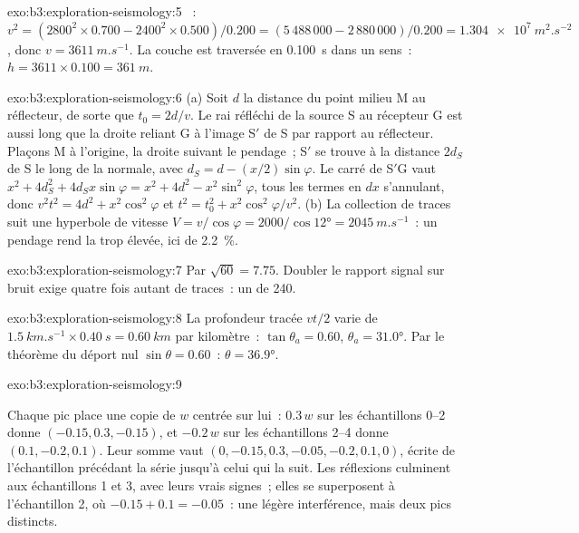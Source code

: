 \begin{solution}{exo:b3:exploration-seismology:5}
~: $v^2 = (2800^2\times0.700 - 2400^2\times0.500)/0.200 = (5\,488\,000 -
2\,880\,000)/0.200 = \qty{1.304e7}{m^2.s^{-2}}$, donc $v = \qty{3611}{m.s^{-1}}$.
La couche est traversée en \qty{0.100}{s} dans un sens~: $h = 3611\times0.100 =
\qty{361}{m}$.
\end{solution}

\begin{solution}{exo:b3:exploration-seismology:6}
(a) Soit $d$ la distance du point milieu M au réflecteur, de sorte que
$t_0 = 2d/v$. Le rai réfléchi de la source S au récepteur G est aussi long
que la droite reliant G à l'image S$'$ de S par rapport au réflecteur. Plaçons M à
l'origine, la droite suivant le pendage~; S$'$ se trouve à la distance $2d_S$ de S le long
de la normale, avec $d_S = d - (x/2)\sin\varphi$. Le carré de S$'$G vaut
$x^2 + 4d_S^2 + 4d_Sx\sin\varphi = x^2 + 4d^2 - x^2\sin^2\varphi$, tous les termes
en $dx$ s'annulant, donc $v^2t^2 = 4d^2 + x^2\cos^2\varphi$ et
$t^2 = t_0^2 + x^2\cos^2\varphi/v^2$. (b) La collection de traces suit une hyperbole de vitesse
$V = v/\cos\varphi = 2000/\cos\ang{12} = \qty{2045}{m.s^{-1}}$~: un pendage rend la
 trop élevée, ici de \qty{2.2}{\percent}.
\end{solution}

\begin{solution}{exo:b3:exploration-seismology:7}
Par $\sqrt{60} = 7.75$. Doubler le rapport signal sur bruit exige quatre fois
autant de traces~: un  de 240.
\end{solution}

\begin{solution}{exo:b3:exploration-seismology:8}
La profondeur tracée $vt/2$ varie de $\qty{1.5}{km.s^{-1}}\times\qty{0.40}{s}
= \qty{0.60}{km}$ par kilomètre~: $\tan\theta_a = 0.60$, $\theta_a = \ang{31.0}$.
Par le théorème du déport nul $\sin\theta = 0.60$~: $\theta = \ang{36.9}$.
\end{solution}

\begin{solution}{exo:b3:exploration-seismology:9}
{\sloppy Chaque pic place une copie de $w$ centrée sur lui~: $0.3\,w$ sur les échantillons 0--2 donne
$(-0.15, 0.3, -0.15)$, et $-0.2\,w$ sur les échantillons 2--4 donne $(0.1, -0.2, 0.1)$.
Leur somme vaut $(0, -0.15, 0.3, -0.05, -0.2, 0.1, 0)$, écrite de l'échantillon
précédant la série jusqu'à celui qui la suit. Les réflexions culminent aux échantillons 1 et 3, avec
leurs vrais signes~; elles se superposent à l'échantillon 2, où $-0.15 + 0.1 = -0.05$~: une
légère interférence, mais deux pics distincts.\par}
\end{solution}

